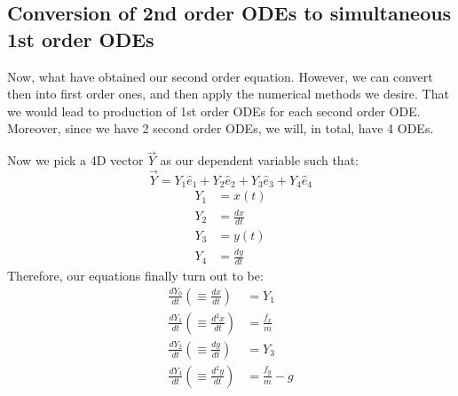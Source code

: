 \documentclass[12pt]{article}
\begin{document}
\subsection{Conversion of 2nd order ODEs to simultaneous 1st order ODEs}
Now, what have obtained our second order equation. However, we can convert then into first order ones, and then apply the numerical methods we desire. That we would lead to production of 1st order ODEs for each second order ODE. Moreover, since we have 2 second order ODEs, we will, in total, have 4 ODEs. 

Now we pick a 4D vector $\Vec{Y}$ as our dependent variable such that: $$\Vec{Y} = Y_1\hat{e}_1 + Y_2\hat{e}_2 + Y_3\hat{e}_3 + Y_4\hat{e}_4 $$
\begin{align}
    Y_1 &= x(t) \\
    Y_2 &= \frac{dx}{dt} \\
    Y_3 &= y(t) \\
    Y_4 &= \frac{dy}{dt}
\end{align}
Therefore, our equations finally turn out to be:
\begin{align}
    \frac{dY_0}{dt} \left(\equiv \frac{dx}{dt}\right) &= Y_1 \\
    \frac{dY_1}{dt} \left(\equiv \frac{d^2x}{dt}\right) &= \frac{f_x}{m} \\
    \frac{dY_2}{dt} \left(\equiv \frac{dy}{dt}\right) &= Y_3 \\
    \frac{dY_3}{dt} \left(\equiv \frac{d^2y}{dt}\right) &= \frac{f_y}{m} - g 
\end{align}
\newpage
\end{document}
